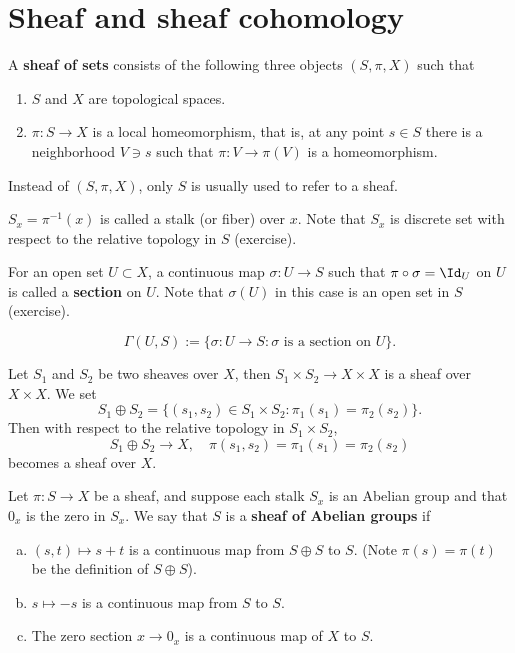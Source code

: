 \documentclass[12pt]{article}
\begin{document}
\section{Sheaf and sheaf cohomology}
\begin{definition}
  A \textbf{sheaf of sets} consists of the following three objects \((S,\pi,X)\) such
  that
  \begin{enumerate}[1.]
  \item \(S\) and \(X\) are topological spaces.
  \item \(\pi\colon S\to X\) is a local homeomorphism, that is, at any point \(s\in S\)
    there is a neighborhood \(V\ni s\) such that \(\pi\colon V\to \pi(V)\) is
    a homeomorphism.
  \end{enumerate}
\end{definition}
\begin{remark}
  Instead of \((S,\pi,X)\), only \(S\) is usually used to refer to a sheaf.
\end{remark}

\begin{definition}
  \(S_x=\pi^{-1}(x)\) is called a stalk (or fiber) over \(x\). Note that \(S_x\) is
  discrete set with respect to the relative topology in \(S\) (exercise).
\end{definition}
\begin{remark}
  For an open set \(U\subset X\), a continuous map \(\sigma\colon U\to S\) such that
  \(\pi\circ \sigma=\Id_U\) on \(U\) is called a \textbf{section} on \(U\).
  Note that \(\sigma(U)\) in this case is an open set in \(S\) (exercise).
\end{remark}

\begin{definition}
  \[
    \Gamma(U,S):=\{\sigma\colon U\to S:\sigma \text{ is a section on }U\}.
  \]
\end{definition}

Let \(S_1\) and \(S_2\) be two sheaves over \(X\), then \(S_1\times S_2\to X\times X\)
is a sheaf over \(X\times X\). We set \[
  S_1\oplus S_2=\{(s_1,s_2)\in S_1\times S_2:\pi_1(s_1)=\pi_2(s_2)\}
.\] Then with respect to the relative topology in \(S_1\times S_2\), \[
  S_1\oplus S_2\to X,\quad\pi(s_1,s_2)=\pi_1(s_1)=\pi_2(s_2)
\] becomes a sheaf over \(X\).

Let \(\pi\colon S\to X\) be a sheaf, and suppose each stalk \(S_x\) is an Abelian
group and that \(0_x\) is the zero in \(S_x\). We say that \(S\) is a \textbf{sheaf of
Abelian groups} if 
\begin{enumerate}[(a)]
\item \((s,t)\mapsto s+t\) is a continuous map from \(S\oplus S\) to \(S\). (Note 
  \(\pi(s)=\pi(t)\) be the definition of \(S\oplus S\)).
\item \(s\mapsto -s\) is a continuous map from \(S\) to \(S\).
\item The zero section \(x\to 0_x\) is a continuous map of \(X\) to \(S\).
\end{enumerate}
\end{document}
